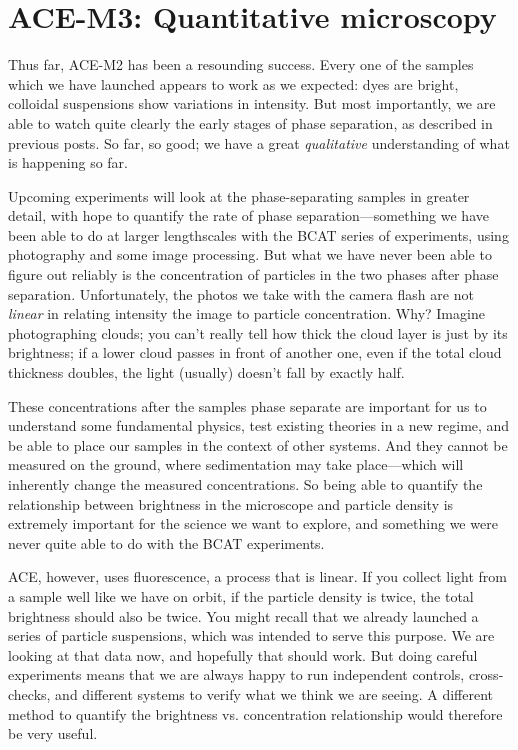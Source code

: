 \section{ACE-M3: Quantitative microscopy}\label{ace-m3-quantitative-microscopy}
Thus far, ACE-M2 has been a resounding success. Every one of the samples which
we have launched appears to work as we expected: dyes are bright, colloidal
suspensions show variations in intensity. But most importantly, we are able to
watch quite clearly the early stages of phase separation, as described in
previous posts. So far, so good; we have a great \emph{qualitative}
understanding of what is happening so far.

Upcoming experiments will look at the phase-separating samples in greater
detail, with hope to quantify the rate of phase separation---something we have
been able to do at larger lengthscales with the BCAT series of experiments,
using photography and some image processing. But what we have never been able to
figure out reliably is the concentration of particles in the two phases after
phase separation. Unfortunately, the photos we take with the camera flash are
not \emph{linear} in relating intensity the image to particle concentration.
Why? Imagine photographing clouds; you can't really tell how thick the cloud
layer is just by its brightness; if a lower cloud passes in front of another
one, even if the total cloud thickness doubles, the light (usually) doesn't fall
by exactly half.

These concentrations after the samples phase separate are important for us to
understand some fundamental physics, test existing theories in a new regime, and
be able to place our samples in the context of other systems. And they cannot be
measured on the ground, where sedimentation may take place---which will
inherently change the measured concentrations. So being able to quantify the
relationship between brightness in the microscope and particle density is
extremely important for the science we want to explore, and something we were
never quite able to do with the BCAT experiments.

ACE, however, uses fluorescence, a process that is linear. If you collect light
from a sample well like we have on orbit, if the particle density is twice, the
total brightness should also be twice. You might recall that we already launched
a series of particle suspensions, which was intended to serve this purpose. We
are looking at that data now, and hopefully that should work. But doing careful
experiments means that we are always happy to run independent controls,
cross-checks, and different systems to verify what we think we are seeing. A
different method to quantify the brightness vs. concentration relationship would
therefore be very useful.

